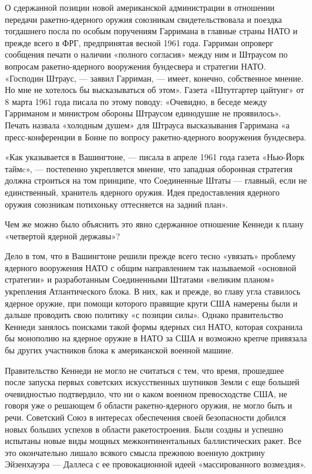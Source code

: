 \documentclass[12pt, a4paper, openany]{book}
\begin{document}
	О сдержанной позиции новой американской администрации в отношении передачи ракетно-ядерного оружия союзникам свидетельствовала и поездка тогдашнего посла по особым поручениям Гарримана в главные страны НАТО и прежде всего в ФРГ, предпринятая весной 1961 года. Гарриман опроверг сообщения печати о наличии «полного согласия» между ним и Штраусом по вопросам ракетно-ядерного вооружения бундесвера и стратегии НАТО. «Господин Штраус, — заявил Гарриман, — имеет, конечно, собственное мнение. Но мне не хотелось бы высказываться об этом». Газета «Штутгартер цайтунг» от 8 марта 1961 года писала по этому поводу: «Очевидно, в беседе между Гарриманом и министром обороны Штраусом единодушие не проявилось». Печать назвала «холодным душем» для Штрауса высказывания Гарримана «а пресс-конференции в Бонне по вопросу ракетно-ядерного вооружения бундесвера.
	
	«Как указывается в Вашингтоне, — писала в апреле 1961 года газета «Нью-Йорк таймc», — постепенно укрепляется мнение, что западная оборонная стратегия должна строиться на том принципе, что Соединенные Штаты — главный, если не единственный, хранитель ядерного оружия. Идея предоставления ядерного оружия союзникам потихоньку оттесняется на задний план».
	
	Чем же можно было объяснить это явно сдержанное отношение Кеннеди к плану «четвертой ядерной державы»?
	
	Дело в том, что в Вашингтоне решили прежде всего тесно «увязать» проблему ядерного вооружения НАТО с общим направлением так называемой «основной стратегии» и разработанным Соединенными Штатами «великим планом» укрепления Атлантического блока. В них, как и прежде, во главу угла ставилось ядерное оружие, при помощи которого правящие круги США намерены были и дальше проводить свою политику «с позиции силы». Однако правительство Кеннеди занялось поисками такой формы ядерных сил НАТО, которая сохранила бы монополию на ядерное оружие в НАТО за США и возможно крепче привязала бы других участников блока к американской военной машине.
	
	Правительство Кеннеди не могло не считаться с тем, что время, прошедшее после запуска первых советских искусственных шутников Земли с еще большей очевидностью подтвердило, что ни о каком военном превосходстве США, не говоря уже о решающем б области ракетно-ядерного оружия, не могло быть и речи. Советский Союз в интересах обеспечения своей безопасности добился новых больших успехов в области ракетостроения. Были создны и успешно испытаны новые виды мощных межконтинентальных баллистических ракет. Все это окончательно лишало всякого смысла прежнюю военную доктрину Эйзенхауэра — Даллеса с ее провокационной идеей «массированного возмездия».
	
\end{document}

